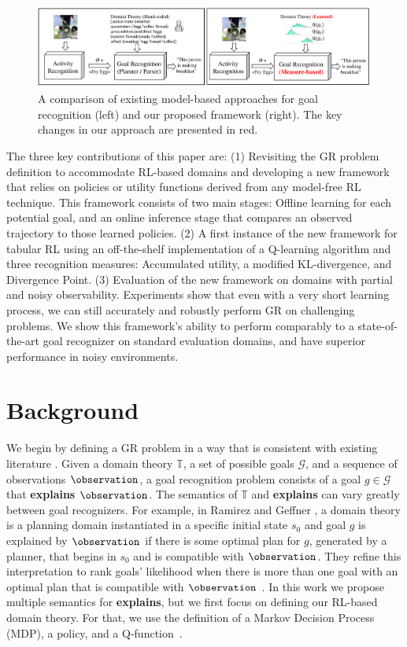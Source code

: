 \documentclass[letterpaper]{article} %
\providecommand\initialstate{\ensuremath{s_{0}}}
\providecommand\theory{\mathbb{T}}
\providecommand\goals{\mathcal{G}}
\providecommand\goal{g}
\begin{document}
\begin{figure}[t]
    \centering
    \includegraphics[width=\textwidth]{Figures/cooking-new.pdf}
    \caption{A comparison of existing model-based approaches for goal recognition (left) and our proposed framework (right). The key changes in our approach are presented in red.}
    \label{fig:cooking}
\end{figure}

The three key contributions of this paper are: 
(1) Revisiting the GR problem definition to accommodate RL-based domains and developing a new framework that relies on policies or utility functions derived from any model-free RL technique. This framework consists of two main stages: Offline learning 
for each potential goal, and an online inference stage that compares an observed trajectory to those learned policies.  
(2) A first instance of the new framework for tabular RL
using an off-the-shelf implementation of a Q-learning algorithm and three recognition measures: Accumulated utility, a modified KL-divergence, and Divergence Point. 
(3) Evaluation of the new framework 
on domains with partial and noisy observability. 
Experiments show that even with a very short learning process, we can still accurately and robustly perform GR on challenging problems. 
We show this framework's ability to perform comparably to a state-of-the-art goal recognizer on standard evaluation domains, and have superior performance in noisy environments.

\section*{Background}
\label{sec:background}

We begin by defining a GR problem in a way that is consistent with existing literature \cite{Meneguzzi2021,mirsky2021introduction}. Given a domain theory $\theory$, a set of possible goals $\goals$, and a sequence of observations $\observation$, a goal recognition problem consists of a goal $\goal \in \goals$ that \textbf{explains} $\observation$. %
The semantics of $\theory$ and \textbf{explains} can vary greatly between goal recognizers. 
For example, in Ramirez and Geffner , a domain theory is a planning domain instantiated in a specific initial state $\initialstate$ and goal $\goal$ is explained by $\observation$ if there is some optimal plan for $\goal$, generated by a planner, that begins in $\initialstate$ and is compatible with $\observation$. 
They refine this interpretation to rank goals' likelihood when there is more than one goal with an optimal plan that is compatible with $\observation$ \cite{ramirez2010probabilistic}. 
In this work we propose multiple semantics for \textbf{explains}, but we first focus on defining our RL-based domain theory. 
For that, we use the definition of a Markov Decision Process (MDP), a policy, and a Q-function~\cite{sutton2018reinforcement}. 
\end{document}
